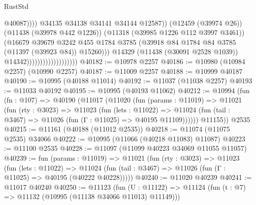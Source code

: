 \begin{lexlean}{RustStd}
\begin{coremodule}
                                                        @40087))))
                                                @34135
                                                @34138
                                                @34141
                                                @34144
                                                @12587))
                                            (@12459 (@39974 @26))
                                            (@11438 (@39978 @442 @1226))
                                            (@11318 (@39985 @1226 @112 @3997 @3461))
                                            (@16679
                                              @39679
                                              @3242
                                              @455
                                              @1784
                                              @3785
                                              (@39918
                                                @84
                                                @1784
                                                @84
                                                @3785
                                                (@11397 (@39923 @84))
                                                @15260)))
                                          @14329
                                          (@11438 (@30091 @2528 @1039))
                                          @14342)))))))))))))))))))
@40182 := @10978 @2257
@40186 := @10980 (@10984 @2257) (@10990 @2257)
@40187 := @11009 @2257
@40188 := @10999 @40187
@40190 := @10995 (@40188 @11014)
@40192 := @11037 (@11038 @2257)
@40193 := @11033 @40192
@40195 := @10995 (@40193 @11062)
@40212 := @10994
    (fun (fn : @107) =>
    @40190
      (@11017
        (@11020
          (fun (params : @11019) =>
          @11021
            (fun (rty : @3023) =>
            @11023
              (fun (lets : @11022) =>
              @11024 (fun (tail : @3467) => @11026 (fun (Γ : @11025) => @40195 @11109))))))
        @11155))
    @2535
@40215 := @11161 (@40188 (@11012 @2535))
@40218 := @11074 (@11075 @2535) @34066
@40222 := @10995 (@11066 (@40218 @11083) @11087)
@40223 := @11100 @2535
@40228 := @11097 (@11099 @40223 @34069 @11055 @11057)
@40239 := fun (params : @11019) =>
  @11021
    (fun (rty : @3023) =>
    @11023
      (fun (lets : @11022) =>
      @11024 (fun (tail : @3467) => @11026 (fun (Γ : @11025) => @40195 (@40222 @40228)))))
@40240 := @11020 @40239
@40241 := @11017 @40240
@40250 := @11123
    (fun (U : @11122) => @11124 (fun (t : @7) => @11132 (@10995 (@11138 @34066 @11013) @11149)))

\end{coremodule}
\end{lexlean}
